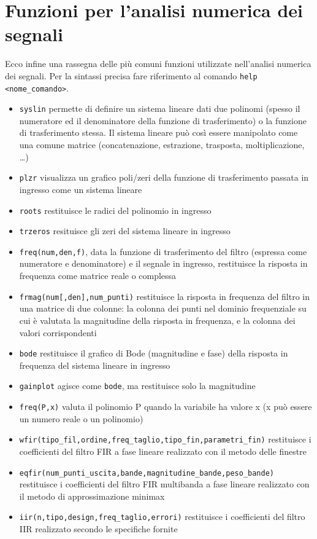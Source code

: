 \section{Funzioni per l'analisi numerica dei segnali}
Ecco infine una rassegna delle pi\`u comuni funzioni utilizzate nell'analisi numerica dei segnali. Per la sintassi precisa fare riferimento al comando \verb+help <nome_comando>+.
\begin{itemize}
\item \verb+syslin+ permette di definire un sistema lineare dati due polinomi (spesso il numeratore ed il denominatore della funzione di trasferimento) o la funzione di trasferimento stessa. Il sistema lineare pu\`o cos\`i essere manipolato come una comune matrice (concatenazione, estrazione, trasposta, moltiplicazione, \dots)
\item \verb+plzr+ visualizza un grafico poli/zeri della funzione di trasferimento passata in ingresso come un sistema lineare
\item \verb+roots+ restituisce le radici del polinomio in ingresso
\item \verb+trzeros+ resituisce gli zeri del sistema lineare in ingresso
\item \verb+freq(num,den,f)+, data la funzione di trasferimento del filtro (espressa come numeratore e denominatore) e il segnale in ingresso, restituisce la risposta in frequenza come matrice reale o complessa
\item \verb+frmag(num[,den],num_punti)+ restituisce la risposta in frequenza del filtro in una matrice di due colonne: la colonna dei punti nel dominio frequenziale su cui \`e valutata la magnitudine della risposta in frequenza, e la colonna dei valori corrispondenti
\item \verb+bode+ restituisce il grafico di Bode (magnitudine e fase) della risposta in frequenza del sistema lineare in ingresso
\item \verb+gainplot+ agisce come \verb+bode+, ma restituisce solo la magnitudine
\item \verb+freq(P,x)+ valuta il polinomio P quando la variabile ha valore x (x pu\`o essere un numero reale o un polinomio)
\item \verb+wfir(tipo_fil,ordine,freq_taglio,tipo_fin,parametri_fin)+ restituisce i coefficienti del filtro FIR a fase lineare realizzato con il metodo delle finestre
\item \verb+eqfir(num_punti_uscita,bande,magnitudine_bande,peso_bande)+ restituisce i coefficienti del filtro FIR multibanda a fase lineare realizzato con il metodo di approssimazione minimax
\item \verb+iir(n,tipo,design,freq_taglio,errori)+ restituisce i coefficienti del filtro IIR realizzato secondo le specifiche fornite
\end{itemize}
%
